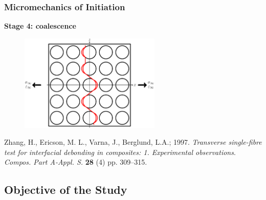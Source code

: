\documentclass[first,firstsupp,lastsupp,last,hyperref,table]{ETHclass}
\begin{document}
\begin{frame}
\frametitle{\vspace{0.2cm}\small Micromechanics of Initiation}
\vspace{-0.5cm}
\centering
\begin{alertblock}{\centering\scriptsize\bf Stage 4: coalescence}
\vspace{-0.25cm}
\begin{figure}
\centering
\includegraphics[width=0.6\textwidth]{stage4-coalescence.pdf}
\end{figure}
\end{alertblock}
\vspace{-0.5cm}
{\tiny Zhang, H., Ericson, M. L., Varna, J., Berglund, L.A.; 1997. {\em\tiny Transverse single-fibre test for interfacial debonding in composites: 1. Experimental observations}. {\it\tiny Compos. Part A-Appl. S.} {\bf\tiny 28} (4) pp. 309--315.}
\end{frame}

\subsection{Objective of the Study}
\end{document}
